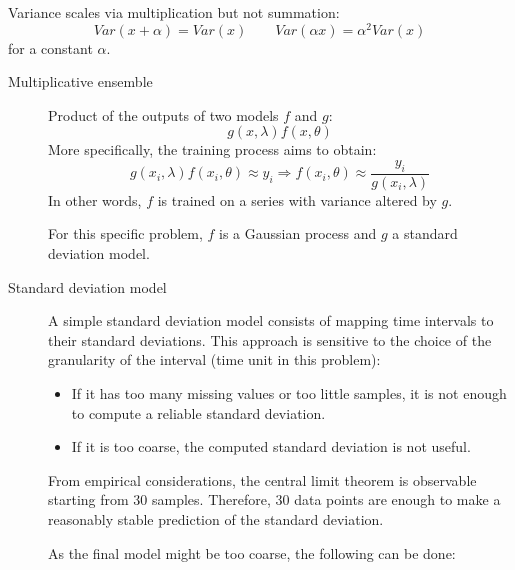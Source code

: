 \begin{remark}
    Variance scales via multiplication but not summation:
    \[ Var(x + \alpha) = Var(x) \qquad Var(\alpha x) = \alpha^2 Var(x) \]
    for a constant $\alpha$.
\end{remark}

\begin{description}
    \item[Multiplicative ensemble]
        Product of the outputs of two models $f$ and $g$:
        \[ g(x, \lambda) f(x, \theta) \]
        More specifically, the training process aims to obtain:
        \[ g(x_i, \lambda) f(x_i, \theta) \approx y_i \Rightarrow f(x_i, \theta) \approx \frac{y_i}{g(x_i, \lambda)} \]
        In other words, $f$ is trained on a series with variance altered by $g$.

        For this specific problem, $f$ is a Gaussian process and $g$ a standard deviation model.
\end{description}

\begin{description}
    \item[Standard deviation model] 
        A simple standard deviation model consists of mapping time intervals to their standard deviations. This approach is sensitive to the choice of the granularity of the interval (time unit in this problem):
        \begin{itemize}
            \item If it has too many missing values or too little samples, it is not enough to compute a reliable standard deviation.
            \item If it is too coarse, the computed standard deviation is not useful.
        \end{itemize}

        \begin{remark}
            From empirical considerations, the central limit theorem is observable starting from $30$ samples. Therefore, $30$ data points are enough to make a reasonably stable prediction of the standard deviation.
        \end{remark}

        As the final model might be too coarse, the following can be done:
\end{description}